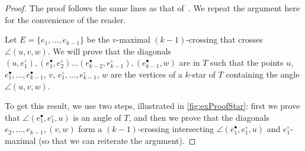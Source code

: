 \documentclass{amsart}
\theoremstyle{remark}
\begin{document}
\begin{proof}
The proof follows the same lines as that of~\cite[Thm.~4.1]{PilaudSantos-multitriangulations}. We repeat the argument here for the convenience of the reader.

Let $E=\{e_1, \dots , e_{k-1}\}$ be the $v$-maximal $(k-1)$-crossing that crosses $\angle(u, v, w)$.
We will prove that the diagonals $(u, e^\circ_1), (e^\bullet_1, e^\circ_2) \dots (e^\bullet_{k-2}, e^\circ_{k-1}), (e^\bullet_{k-1}, w)$ are in $T$ such that the points $u$, $e^\bullet_1, \dots, e^\bullet_{k-1}$, $v$, $e^\circ_1, \dots, e^\circ_{k-1}$, $w$ are the vertices of a $k$-star of $T$ containing the angle $\angle(u, v, w)$. 

To get this result, we use two steps, illustrated in \cref{fig:exProofStar}: first we prove that $\angle(e^\bullet_1, e^\circ_1, u)$ is an angle of $T$, and then we prove that the diagonals $e_2, \dots, e_{k-1}, (v, w)$ form a $(k-1)$-crossing intersecting $\angle(e^\bullet_1, e^\circ_1, u)$ and $e^\circ_1$-maximal (so that we can reiterate the argument).



\end{proof}
\end{document}
